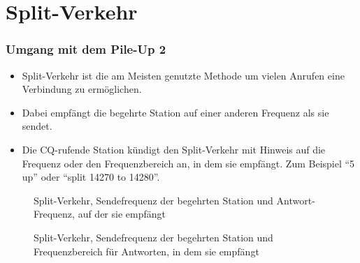 
\section{Split-Verkehr}
\label{section:split_betrieb}
\begin{frame}%

\frametitle{Umgang mit dem Pile-Up 2}
\begin{itemize}
  \item Split-Verkehr ist die am Meisten genutzte Methode um vielen Anrufen eine Verbindung zu ermöglichen.
  \item Dabei empfängt die begehrte Station auf einer anderen Frequenz als sie sendet.
  \item Die CQ-rufende Station kündigt den Split-Verkehr mit Hinweis auf die Frequenz oder den Frequenzbereich an, in dem sie empfängt. Zum Beispiel \enquote{5 up} oder \enquote{split 14270 to 14280}.
  \end{itemize}

\end{frame}

\begin{frame}
\begin{figure}
    \caption{\scriptsize Split-Verkehr, Sendefrequenz der begehrten Station und Antwort-Frequenz, auf der sie empfängt}
    \label{n_split_verkehr_anruffrequenz}
\end{figure}


\begin{figure}
    \caption{\scriptsize Split-Verkehr, Sendefrequenz der begehrten Station und Frequenzbereich für Antworten, in dem sie empfängt}
    \label{n_split_verkehr_anrufbereich}
\end{figure}

\end{frame}

\begin{frame}
\end{frame}

